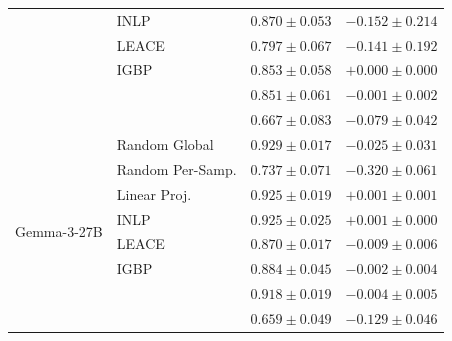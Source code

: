 \begin{longtable}{ll rr}
   & INLP & $0.870{\pm}0.053$ & $-0.152{\pm}0.214$ \\
   & LEACE & $0.797{\pm}0.067$ & $-0.141{\pm}0.192$ \\
   & IGBP & $0.853{\pm}0.058$ & $+0.000{\pm}0.000$ \\
   & \AmbGCE{} & $0.851{\pm}0.061$ & $-0.001{\pm}0.002$ \\
   & \TanGCE{} & \textbf{$0.667{\pm}0.083$} & $-0.079{\pm}0.042$ \\
  \midrule
  \multirow{8}{*}{Gemma-3-27B} & Random Global & $0.929{\pm}0.017$ & $-0.025{\pm}0.031$ \\
   & Random Per-Samp. & $0.737{\pm}0.071$ & $-0.320{\pm}0.061$ \\
   & Linear Proj. & $0.925{\pm}0.019$ & $+0.001{\pm}0.001$ \\
   & INLP & $0.925{\pm}0.025$ & $+0.001{\pm}0.000$ \\
   & LEACE & $0.870{\pm}0.017$ & $-0.009{\pm}0.006$ \\
   & IGBP & $0.884{\pm}0.045$ & $-0.002{\pm}0.004$ \\
   & \AmbGCE{} & $0.918{\pm}0.019$ & $-0.004{\pm}0.005$ \\
   & \TanGCE{} & \textbf{$0.659{\pm}0.049$} & $-0.129{\pm}0.046$ \\
\end{longtable}


